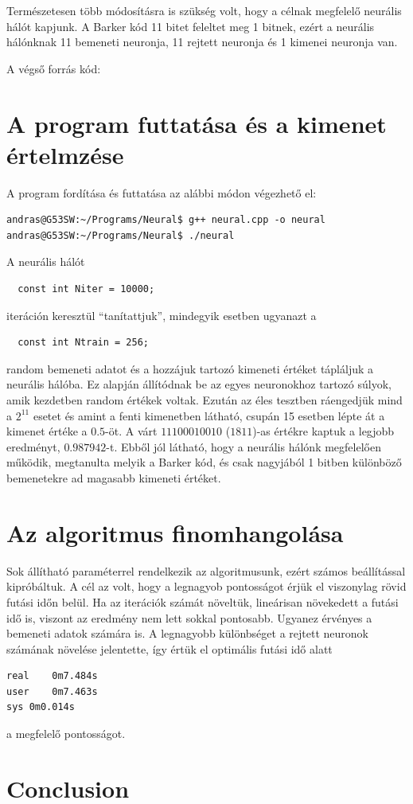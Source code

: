 \documentclass[a4paper]{article}
\begin{document}
Természetesen több módosításra is szükség volt, hogy a célnak megfelelő neurális hálót kapjunk. 
A Barker kód 11 bitet feleltet meg 1 bitnek, ezért a neurális hálónknak 11 bemeneti neuronja, 11 rejtett neuronja és 1 kimenei neuronja van.

A végső forrás kód:



\section{A program futtatása és a kimenet értelmzése}

A program fordítása és futtatása az alábbi módon végezhető el:

\lstset{language=Bash}
\begin{lstlisting}
andras@G53SW:~/Programs/Neural$ g++ neural.cpp -o neural
andras@G53SW:~/Programs/Neural$ ./neural
\end{lstlisting}



A neurális hálót

\lstset{language=C++}
\begin{lstlisting}
  const int Niter = 10000;
\end{lstlisting}
iteráción keresztül ``tanítattjuk'', mindegyik esetben ugyanazt a
\begin{lstlisting}
  const int Ntrain = 256;
\end{lstlisting}
random bemeneti adatot és a hozzájuk tartozó kimeneti értéket tápláljuk a neurális hálóba. Ez alapján állítódnak be az egyes neuronokhoz tartozó súlyok, amik kezdetben random értékek voltak. Ezután az éles tesztben ráengedjük mind a $2^{11}$ esetet és amint a fenti kimenetben látható, csupán 15 esetben lépte át a kimenet értéke a $0.5$-öt. A várt $11100010010$ ($1811$)-as értékre kaptuk a legjobb eredményt, $0.987942$-t. Ebből jól látható, hogy a neurális hálónk megfelelően működik, megtanulta melyik a Barker kód, és csak nagyjából 1 bitben különböző bemenetekre ad magasabb kimeneti értéket.

\section{Az algoritmus finomhangolása}
Sok állítható paraméterrel rendelkezik az algoritmusunk, ezért számos beállítással kipróbáltuk. A cél az volt, hogy a legnagyob pontosságot érjük el viszonylag rövid futási időn belül. Ha az iterációk számát növeltük, lineárisan növekedett a futási idő is, viszont az eredmény nem lett sokkal pontosabb. Ugyanez érvényes a bemeneti adatok számára is. A legnagyobb különbséget a rejtett neuronok számának növelése jelentette, így értük el optimális futási idő alatt

\lstset{language=Bash}
\begin{lstlisting}
real	0m7.484s
user	0m7.463s
sys	0m0.014s
\end{lstlisting}

a megfelelő pontosságot.

\section{Conclusion}
\end{document}
